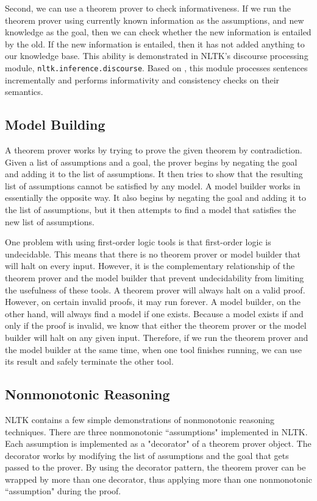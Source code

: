 \documentclass{article}
\newcommand{\dhgcode}[1]{{\tt #1}}
\begin{document}
Second, we can use a theorem prover to check informativeness.  If we run the theorem prover using currently known information as the assumptions, and new knowledge as the goal, then we can check whether the new information is entailed by the old.  If the new information is entailed, then it has not added anything to our knowledge base.  This ability is demonstrated in NLTK's discourse processing module, \dhgcode{nltk.inference.discourse}.  Based on \cite{BB}, this module processes sentences incrementally and performs informativity and consistency checks on their semantics.

\subsection{Model Building}
A theorem prover works by trying to prove the given theorem by contradiction.  Given a list of assumptions and a goal, the prover begins by negating the goal and adding it to the list of assumptions.  It then tries to show that the resulting list of assumptions cannot be satisfied by any model.  A model builder works in essentially the opposite way.  It also begins by negating the goal and adding it to the list of assumptions, but it then attempts to find a model that satisfies the new list of assumptions.  

One problem with using first-order logic tools is that first-order logic is undecidable.  This means that there is no theorem prover or model builder that will halt on every input.  However, it is the complementary relationship of the theorem prover and the model builder that prevent undecidability from limiting the usefulness of these tools.  A theorem prover will always halt on a valid proof.  However, on certain invalid proofs, it may run forever.  A model builder, on the other hand, will always find a model if one exists.  Because a model exists if and only if the proof is invalid, we know that either the theorem prover or the model builder will halt on any given input.  Therefore, if we run the theorem prover and the model builder at the same time, when one tool finishes running, we can use its result and safely terminate the other tool.


\subsection{Nonmonotonic Reasoning}

NLTK contains a few simple demonstrations of nonmonotonic reasoning techniques.  There are three nonmonotonic ``assumptions" implemented in NLTK.  Each assumption is implemented as a "decorator" of a theorem prover object.  The decorator works by modifying the list of assumptions and the goal that gets passed to the prover.  By using the decorator pattern, the theorem prover can be wrapped by more than one decorator, thus applying more than one nonmonotonic ``assumption" during the proof.
\end{document}
